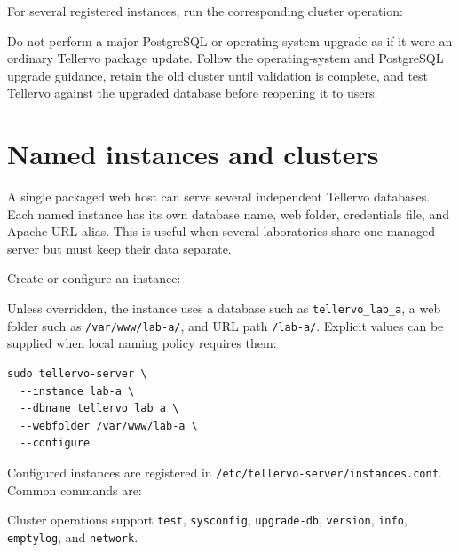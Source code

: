 For several registered instances, run the corresponding cluster operation:


Do not perform a major PostgreSQL or operating-system upgrade as if it were an
ordinary Tellervo package update. Follow the operating-system and PostgreSQL
upgrade guidance, retain the old cluster until validation is complete, and test
Tellervo against the upgraded database before reopening it to users.

\section{Named instances and clusters}

A single packaged web host can serve several independent Tellervo databases.
Each named instance has its own database name, web folder, credentials file, and
Apache URL alias. This is useful when several laboratories share one managed
server but must keep their data separate.

Create or configure an instance:


Unless overridden, the instance uses a database such as
\verb|tellervo_lab_a|, a web folder such as \verb|/var/www/lab-a/|, and URL path
\verb|/lab-a/|. Explicit values can be supplied when local naming policy
requires them:

\begin{lstlisting}
sudo tellervo-server \
  --instance lab-a \
  --dbname tellervo_lab_a \
  --webfolder /var/www/lab-a \
  --configure
\end{lstlisting}

Configured instances are registered in
\verb|/etc/tellervo-server/instances.conf|. Common commands are:

\code{sudo tellervo-server --cluster version}

Cluster operations support \verb|test|, \verb|sysconfig|,
\verb|upgrade-db|, \verb|version|, \verb|info|, \verb|emptylog|, and
\verb|network|.



